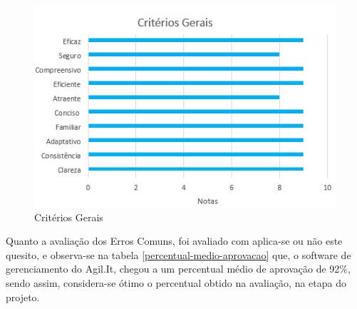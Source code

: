 \begin{figure}[H]
	\caption{\label{criterios-gerais}Critérios Gerais}
	\begin{center}
		\includegraphics[scale=0.86]{./Figuras/cap-testes/criterios-gerais.jpeg}
	\end{center}
\end{figure}

Quanto a avaliação dos Erros Comuns, foi avaliado com aplica-se ou não este quesito, e observa-se na tabela \ref{percentual-medio-aprovacao} que, o software de gerenciamento do Agil.It, chegou a um percentual médio de aprovação de 92\%, sendo assim, considera-se ótimo o percentual obtido na avaliação, na etapa do projeto.

